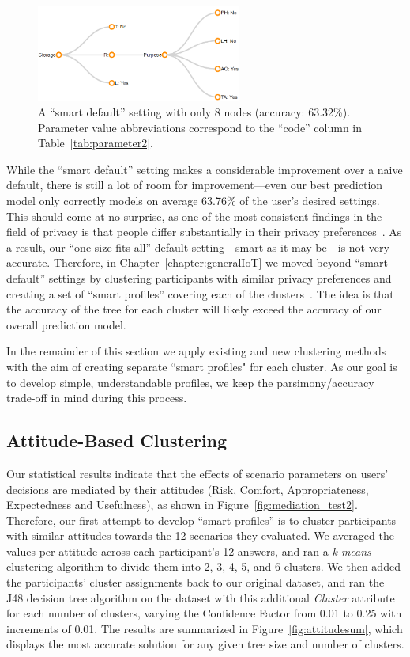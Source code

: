 \begin{figure}
	\centering
	\includegraphics[width=0.6\textwidth]{figures/smartdefault001.png}
	\caption{A ``smart default'' setting with only 8 nodes (accuracy: 63.32\%). Parameter value abbreviations correspond to the ``code'' column in Table~\ref{tab:parameter2}.}
	\label{fig:smart_default_new}
\end{figure}


While the ``smart default'' setting makes a considerable improvement over a naive default, there is still a lot of room for improvement---even our best prediction model only correctly models on average 63.76\% of the user's desired settings. This should come at no surprise, as one of the most consistent findings in the field of privacy is that people differ substantially in their privacy preferences~\cite{knijnenburg2013dimensionality}. As a result, our ``one-size fits all'' default setting---smart as it may be---is not very accurate. Therefore, in Chapter~\ref{chapter:generalIoT} we moved beyond ``smart default'' settings by clustering participants with similar privacy preferences and creating a set of ``smart profiles'' covering each of the clusters~\cite{bahiratiui2018}. The idea is that the accuracy of the tree for each cluster will likely exceed the accuracy of our overall prediction model. 

In the remainder of this section we apply existing and new clustering methods with the aim of creating separate ``smart profiles" for each cluster. As our goal is to develop simple, understandable profiles, we keep the parsimony/accuracy trade-off in mind during this process.


\subsection{Attitude-Based Clustering}
Our statistical results indicate that the effects of scenario parameters on users' decisions are mediated by their attitudes (Risk, Comfort, Appropriateness, Expectedness and Usefulness), as shown in Figure~\ref{fig:mediation_test2}. Therefore, our first attempt to develop ``smart profiles'' is to cluster participants with similar attitudes towards the 12 scenarios they evaluated. We averaged the values per attitude across each participant's 12 answers, and ran a \textit{k-means} clustering algorithm to divide them into 2, 3, 4, 5, and 6 clusters. We then added the participants' cluster assignments back to our original dataset, and ran the J48 decision tree algorithm on the dataset with this additional \emph{Cluster} attribute for each number of clusters, varying the Confidence Factor from 0.01 to 0.25 with increments of 0.01. The results are summarized in Figure~\ref{fig:attitudesum}, which displays the most accurate solution for any given tree size and number of clusters.

